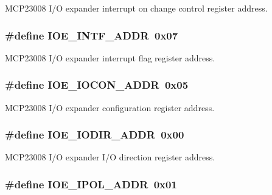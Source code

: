 M\-C\-P23008 I/\-O expander interrupt on change control register address. \hypertarget{a00008_a32cac2ad5af58a2562540ec8fc205dd1}{
\subsubsection[{I\-O\-E\-\_\-\-I\-N\-T\-F\-\_\-\-A\-D\-D\-R}]{\setlength{\rightskip}{0pt plus 5cm}\#define I\-O\-E\-\_\-\-I\-N\-T\-F\-\_\-\-A\-D\-D\-R~0x07}}\label{a00008_a32cac2ad5af58a2562540ec8fc205dd1}
M\-C\-P23008 I/\-O expander interrupt flag register address. \hypertarget{a00008_af44ed2bf93808aeb932ce9944a942b75}{
\subsubsection[{I\-O\-E\-\_\-\-I\-O\-C\-O\-N\-\_\-\-A\-D\-D\-R}]{\setlength{\rightskip}{0pt plus 5cm}\#define I\-O\-E\-\_\-\-I\-O\-C\-O\-N\-\_\-\-A\-D\-D\-R~0x05}}\label{a00008_af44ed2bf93808aeb932ce9944a942b75}
M\-C\-P23008 I/\-O expander configuration register address. \hypertarget{a00008_a36c134b088cc2e64e0a5e14e8f90fe38}{
\subsubsection[{I\-O\-E\-\_\-\-I\-O\-D\-I\-R\-\_\-\-A\-D\-D\-R}]{\setlength{\rightskip}{0pt plus 5cm}\#define I\-O\-E\-\_\-\-I\-O\-D\-I\-R\-\_\-\-A\-D\-D\-R~0x00}}\label{a00008_a36c134b088cc2e64e0a5e14e8f90fe38}
M\-C\-P23008 I/\-O expander I/\-O direction register address. \hypertarget{a00008_a04633cd2ea7fd0b332e1edf066f674c4}{
\subsubsection[{I\-O\-E\-\_\-\-I\-P\-O\-L\-\_\-\-A\-D\-D\-R}]{\setlength{\rightskip}{0pt plus 5cm}\#define I\-O\-E\-\_\-\-I\-P\-O\-L\-\_\-\-A\-D\-D\-R~0x01}}\label{a00008_a04633cd2ea7fd0b332e1edf066f674c4}
